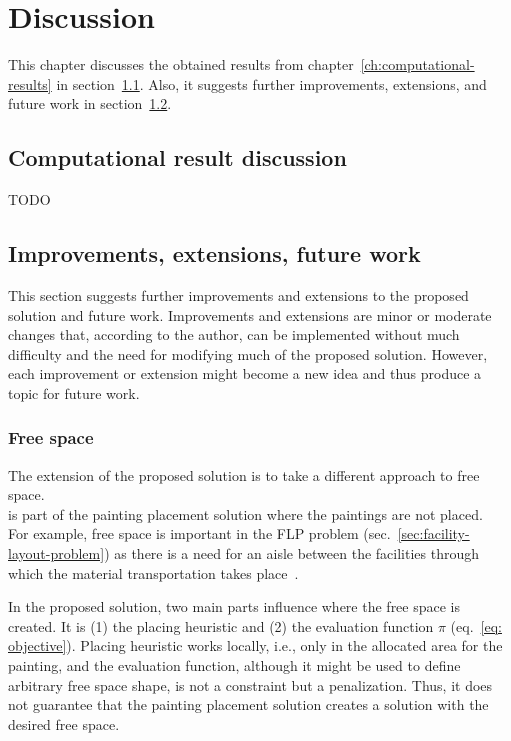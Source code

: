 \chapter{Discussion}\label{ch:discussion}

This chapter discusses the obtained results
from chapter~\ref{ch:computational-results} in section~\ref{sec:comp-res-discussion}.
Also, it suggests further improvements, extensions, and future work in section~\ref{sec:improvements}.


\section{Computational result discussion}\label{sec:comp-res-discussion}
TODO


\section{Improvements, extensions, future work}\label{sec:improvements}
This section suggests further improvements and extensions to the proposed solution
and future work.
Improvements and extensions are minor or moderate changes that, according to the author,
can be implemented without much difficulty and the need for modifying
much of the proposed solution.
However, each improvement or extension might become a new idea and thus produce a topic for future work.

\subsection{Free space}\label{subsec:free-space}

The extension of the proposed solution is to take a different approach to free space.
\\

 is part of the painting placement solution where the paintings are not placed.
\\

For example, free space is important in the FLP problem (sec.~\ref{sec:facility-layout-problem})
as there is a need for an aisle between the facilities
through which the material transportation takes place~\cite{scholzExtensionsSTaTSPractical2010}.

In the proposed solution, two main parts influence where the free space is created.
It is (1) the placing heuristic and (2) the evaluation function $\pi$ (eq.~\ref{eq: objective}).
Placing heuristic works locally, i.e., only in the allocated area for the painting, and the evaluation
function, although it might be used to define arbitrary free space shape, is not a constraint but a penalization.
Thus, it does not guarantee that the painting placement solution creates a solution with the desired free space.

